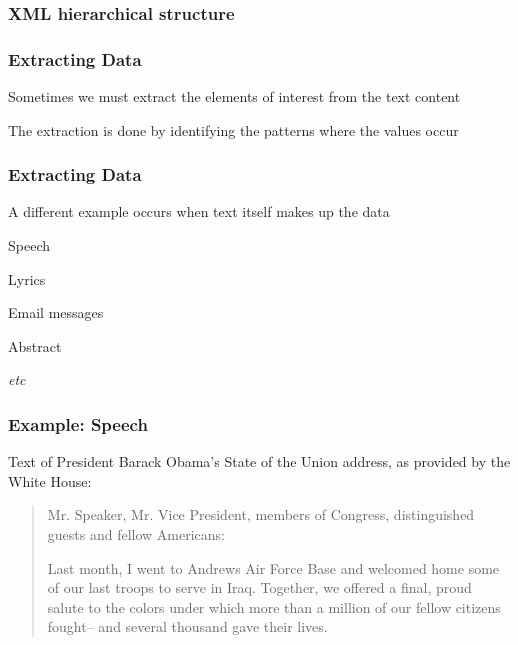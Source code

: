 \documentclass[12pt]{beamer}\usepackage[]{graphicx}\usepackage[]{color}
\begin{document}

\begin{frame}
\frametitle{XML hierarchical structure}
\begin{center}
\end{center}
\end{frame}


\begin{frame}
\frametitle{Extracting Data}

\bbi
  \item Sometimes we must extract the elements of interest from the text content
  \item The extraction is done by identifying the patterns where the values occur
\ei

\end{frame}


\begin{frame}
\frametitle{Extracting Data}

\bi
  \item A different example occurs when text itself makes up the data
  \item Speech
  \item Lyrics
  \item Email messages
  \item Abstract
  \item \textit{etc}
\ei

\end{frame}


\begin{frame}[fragile]
\frametitle{Example: Speech}

{\small Text of President Barack Obama's State of the Union address, as provided by the White House:

\begin{quotation}
Mr. Speaker, Mr. Vice President, members of Congress, distinguished guests and fellow Americans:

Last month, I went to Andrews Air Force Base and welcomed home some of our last troops to serve in Iraq. Together, we offered a final, proud salute to the colors under which more than a million of our fellow citizens fought-- and several thousand gave their lives.
\end{quotation}
}

\end{frame}
\end{document}
